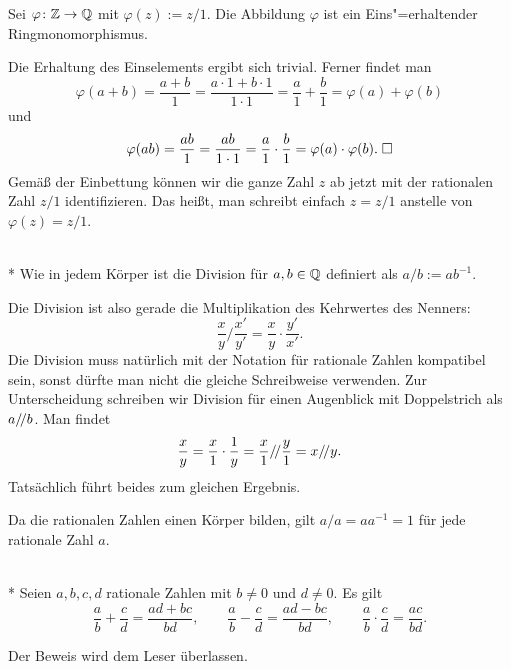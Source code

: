 \newpage
\begin{Satz}\newlinefirst
Sei $\varphi\colon\mathbb Z\to\mathbb Q$ mit $\varphi(z):=z/1$. Die
Abbildung $\varphi$ ist ein Eins"=erhaltender Ringmonomorphismus.
\end{Satz}
 Die Erhaltung des Einselements ergibt sich
trivial. Ferner findet man
\[\varphi(a+b) = \frac{a+b}{1} = \frac{a\cdot 1+b\cdot 1}{1\cdot 1}
= \frac{a}{1}+\frac{b}{1} = \varphi(a)+\varphi(b)\]
und
\[\varphi(ab) = \frac{ab}{1} = \frac{ab}{1\cdot 1} = \frac{a}{1}\cdot\frac{b}{1}
= \varphi(a)\cdot\varphi(b).\;\Box\]
Gemäß der Einbettung können wir die ganze Zahl $z$ ab jetzt
mit der rationalen Zahl $z/1$ identifizieren. Das heißt, man schreibt
einfach $z=z/1$ anstelle von $\varphi(z)=z/1$.

\begin{Definition}\mbox{}\\*
Wie in jedem Körper ist die Division für $a,b\in\mathbb Q$
definiert als $a/b := ab^{-1}$.
\end{Definition}
Die Division ist also gerade die Multiplikation des Kehrwertes
des Nenners:
\[\frac{x}{y}/\frac{x'}{y'} = \frac{x}{y}\cdot\frac{y'}{x'}.\]
Die Division muss natürlich mit der Notation für rationale Zahlen
kompatibel sein, sonst dürfte man nicht die gleiche Schreibweise
verwenden. Zur Unterscheidung schreiben wir Division für einen
Augenblick mit Doppelstrich als $a/\!/ b$. Man findet
\[\frac{x}{y} = \frac{x}{1}\cdot\frac{1}{y}
= \frac{x}{1}/\!/\frac{y}{1} = x/\!/ y.\]
Tatsächlich führt beides zum gleichen Ergebnis.

Da die rationalen Zahlen einen Körper bilden, gilt $a/a=aa^{-1}=1$
für jede rationale Zahl $a$.

\begin{Satz}\mbox{}\\*
Seien $a,b,c,d$ rationale Zahlen mit $b\ne 0$ und $d\ne 0$. Es gilt
\[\frac{a}{b}+\frac{c}{d} = \frac{ad+bc}{bd},
\qquad \frac{a}{b}-\frac{c}{d} = \frac{ad-bc}{bd},
\qquad \frac{a}{b}\cdot\frac{c}{d} = \frac{ac}{bd}.\]
\end{Satz}
Der Beweis wird dem Leser überlassen.
